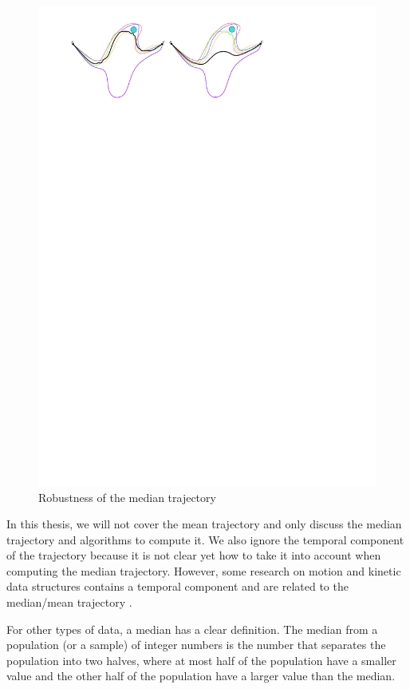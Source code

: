 \begin{figure}
\centering
\includegraphics[scale=1]{Gambar/robust_med}
\caption[Robustness of the median trajectory]{Robustness of the median trajectory} 
\label{fig:robust_med}
\end{figure}

In this thesis, we will not cover the mean trajectory and only discuss the median trajectory and algorithms to compute it.
We also ignore the temporal component of the trajectory because it is not clear yet how to take it into account when computing the median trajectory. 
However, some research on motion and kinetic data structures contains a temporal component and are related to the median/mean trajectory \cite{Agarwal:2003,Agarwal:1997}. 

For other types of data, a median has a clear definition.
The median from a population (or a sample) of integer numbers is the number that separates the population into two halves, where at most half of the population have a smaller value and the other half of the population have a larger value than the median. 

